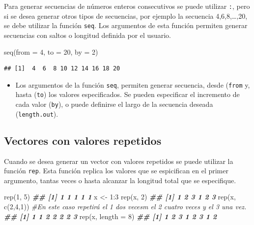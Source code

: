 \documentclass[
]{book}
\newenvironment{Shaded}{\begin{snugshade}}{\end{snugshade}}
\newcommand{\AttributeTok}[1]{\textcolor[rgb]{0.77,0.63,0.00}{#1}}
\newcommand{\CommentTok}[1]{\textcolor[rgb]{0.56,0.35,0.01}{\textit{#1}}}
\newcommand{\DecValTok}[1]{\textcolor[rgb]{0.00,0.00,0.81}{#1}}
\newcommand{\DocumentationTok}[1]{\textcolor[rgb]{0.56,0.35,0.01}{\textbf{\textit{#1}}}}
\newcommand{\FunctionTok}[1]{\textcolor[rgb]{0.00,0.00,0.00}{#1}}
\newcommand{\NormalTok}[1]{#1}
\newcommand{\OtherTok}[1]{\textcolor[rgb]{0.56,0.35,0.01}{#1}}
\newcommand{\SpecialCharTok}[1]{\textcolor[rgb]{0.00,0.00,0.00}{#1}}
\newenvironment{rmdblock}[1]
{\begin{shaded*}
		\begin{itemize}
			\renewcommand{\labelitemi}{
				\raisebox{-.7\height}[0pt][0pt]{
					{\setkeys{Gin}{width=3em,keepaspectratio}\texttt{[image: images/\#1]}}
				}
			}
			\item
		}
		{
		\end{itemize}
	\end{shaded*}
}
\newenvironment{rmdnote}
{\begin{rmdblock}{note}}
	{\end{rmdblock}}
\begin{document}
Para generar secuencias de números enteros consecutivos se puede utilizar \texttt{:}, pero si se desea generar otros tipos de secuencias, por ejemplo la secuencia 4,6,8,\ldots,20, se debe utilizar la función \texttt{seq}. Los argumentos de esta función permiten generar secuencias con saltos o longitud definida por el usuario.

\begin{Shaded}
\begin{Highlighting}[]
\FunctionTok{seq}\NormalTok{(}\AttributeTok{from =} \DecValTok{4}\NormalTok{, }\AttributeTok{to =} \DecValTok{20}\NormalTok{, }\AttributeTok{by =} \DecValTok{2}\NormalTok{)}
\end{Highlighting}
\end{Shaded}

\begin{verbatim}
## [1]  4  6  8 10 12 14 16 18 20
\end{verbatim}

\begin{rmdnote}
Los argumentos de la función \texttt{seq}, permiten generar secuencia,
desde (\texttt{from} y, hasta (\texttt{to}) los valores especificados.
Se pueden especificar el incremento de cada valor (\texttt{by}), o puede
definirse el largo de la secuencia deseada (\texttt{length.out}).
\end{rmdnote}

\hypertarget{vectores-con-valores-repetidos}{%
\subsection{Vectores con valores repetidos}\label{vectores-con-valores-repetidos}}

Cuando se desea generar un vector con valores repetidos se puede utilizar la función \texttt{rep}. Esta función replica los valores que se espicifican en el primer argumento, tantas veces o hasta alcanzar la longitud total que se especifique.

\begin{Shaded}
\begin{Highlighting}[]
\FunctionTok{rep}\NormalTok{(}\DecValTok{1}\NormalTok{, }\DecValTok{5}\NormalTok{)}
\DocumentationTok{\#\# [1] 1 1 1 1 1}
\NormalTok{x }\OtherTok{\textless{}{-}} \DecValTok{1}\SpecialCharTok{:}\DecValTok{3}
\FunctionTok{rep}\NormalTok{(x, }\DecValTok{2}\NormalTok{)}
\DocumentationTok{\#\# [1] 1 2 3 1 2 3}
\FunctionTok{rep}\NormalTok{(x, }\FunctionTok{c}\NormalTok{(}\DecValTok{2}\NormalTok{,}\DecValTok{4}\NormalTok{,}\DecValTok{1}\NormalTok{)) }\CommentTok{\#En este caso repetirá el 1 dos vecesm el 2 cuatro veces y el 3 una vez.}
\DocumentationTok{\#\# [1] 1 1 2 2 2 2 3}
\FunctionTok{rep}\NormalTok{(x, }\AttributeTok{length =} \DecValTok{8}\NormalTok{)}
\DocumentationTok{\#\# [1] 1 2 3 1 2 3 1 2}
\end{Highlighting}
\end{Shaded}
\end{document}
